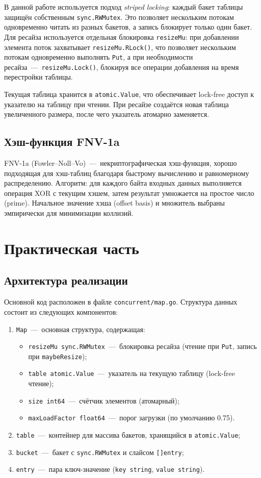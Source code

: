 \documentclass{itmo}
\begin{document}
В данной работе используется подход \textit{striped locking}: каждый бакет таблицы защищён собственным \texttt{sync.RWMutex}.
Это позволяет нескольким потокам одновременно читать из разных бакетов, а запись блокирует только один бакет.
Для ресайза используется отдельная блокировка \texttt{resizeMu}: при добавлении элемента поток захватывает \texttt{resizeMu.RLock()}, что позволяет нескольким потокам одновременно выполнять \texttt{Put}, а при необходимости ресайза~---~\texttt{resizeMu.Lock()}, блокируя все операции добавления на время перестройки таблицы.

Текущая таблица хранится в \texttt{atomic.Value}, что обеспечивает lock-free доступ к указателю на таблицу при чтении.
При ресайзе создаётся новая таблица увеличенного размера, после чего указатель атомарно заменяется.

\section{Хэш-функция FNV-1a}

FNV-1a (Fowler--Noll--Vo)~---~некриптографическая хэш-функция, хорошо подходящая для хэш-таблиц благодаря быстрому вычислению и равномерному распределению.
Алгоритм: для каждого байта входных данных выполняется операция XOR с текущим хэшем, затем результат умножается на простое число (prime).
Начальное значение хэша (offset basis) и множитель выбраны эмпирически для минимизации коллизий.

\chapter{Практическая часть}

\section{Архитектура реализации}

Основной код расположен в файле \texttt{concurrent/map.go}.
Структура данных состоит из следующих компонентов:
\begin{enumerate}
	\item \texttt{Map}~---~основная структура, содержащая:
	\begin{itemize}
		\item \texttt{resizeMu sync.RWMutex}~---~блокировка ресайза (чтение при \texttt{Put}, запись при \texttt{maybeResize});
		\item \texttt{table atomic.Value}~---~указатель на текущую таблицу (lock-free чтение);
		\item \texttt{size int64}~---~счётчик элементов (атомарный);
		\item \texttt{maxLoadFactor float64}~---~порог загрузки (по умолчанию 0.75).
	\end{itemize}
	\item \texttt{table}~---~контейнер для массива бакетов, хранящийся в \texttt{atomic.Value};
	\item \texttt{bucket}~---~бакет с \texttt{sync.RWMutex} и слайсом \texttt{[]entry};
	\item \texttt{entry}~---~пара ключ-значение (\texttt{key string}, \texttt{value string}).
\end{enumerate}
\end{document}
